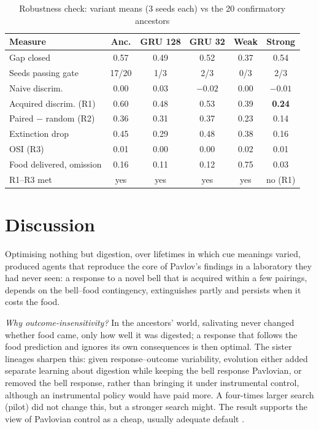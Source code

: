 \documentclass[conference]{IEEEtran}
\begin{document}
\begin{table}[t]
\centering
\caption{Robustness check: variant means (3 seeds each) vs the 20 confirmatory ancestors}
\label{tab:robust}
\footnotesize
\setlength{\tabcolsep}{2.5pt}
\begin{tabular}{@{}lccccc@{}}
\toprule
Measure & Anc. & GRU 128 & GRU 32 & Weak & Strong \\
\midrule
Gap closed & 0.57 & 0.49 & 0.52 & 0.37 & 0.54 \\
Seeds passing gate & 17/20 & 1/3 & 2/3 & 0/3 & 2/3 \\
Naive discrim. & 0.00 & $0.03$ & $-0.02$ & $0.00$ & $-0.01$ \\
Acquired discrim. (R1) & 0.60 & 0.48 & 0.53 & 0.39 & \textbf{0.24} \\
Paired $-$ random (R2) & 0.36 & 0.31 & 0.37 & 0.23 & 0.14 \\
Extinction drop & 0.45 & 0.29 & 0.48 & 0.38 & 0.16 \\
OSI (R3) & 0.01 & 0.00 & 0.00 & 0.02 & 0.01 \\
Food delivered, omission & 0.16 & 0.11 & 0.12 & 0.75 & 0.03 \\
\midrule
R1--R3 met & yes & yes & yes & yes & no (R1) \\
\bottomrule
\end{tabular}
\end{table}

\section{Discussion}
Optimising nothing but digestion, over lifetimes in which cue meanings varied, produced agents that reproduce the core of Pavlov's findings in a laboratory they had never seen: a response to a novel bell that is acquired within a few pairings, depends on the bell--food contingency, extinguishes partly and persists when it costs the food.

\textit{Why outcome-insensitivity?} In the ancestors' world, salivating never changed whether food came, only how well it was digested; a response that follows the food prediction and ignores its own consequences is then optimal. The sister lineages sharpen this: given response--outcome variability, evolution either added separate learning about digestion while keeping the bell response Pavlovian, or removed the bell response, rather than bringing it under instrumental control, although an instrumental policy would have paid more. A four-times larger search (pilot) did not change this, but a stronger search might. The result supports the view of Pavlovian control as a cheap, usually adequate default \cite{dayan06}.
\end{document}
